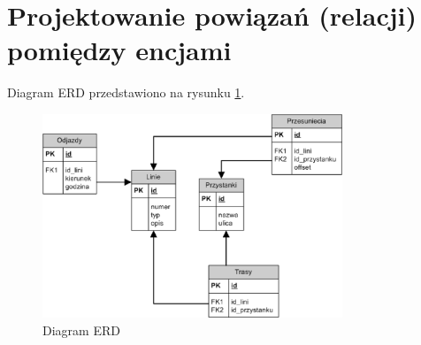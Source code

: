 \section{Projektowanie powiązań (relacji) pomiędzy encjami}


Diagram ERD przedstawiono na rysunku \ref{fig:erd}.

\begin{figure}[!htp]
    \centering
    \includegraphics[width=0.8\textwidth]{./img/bus-agenda-erd.eps}
    \caption{Diagram ERD}
    \label{fig:erd}
\end{figure}

